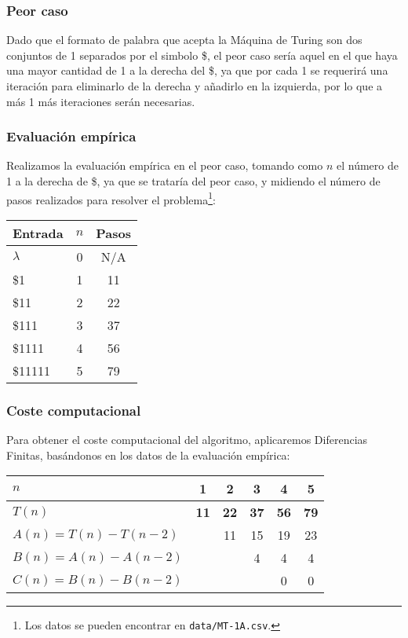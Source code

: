 \subsubsection*{Peor caso}
Dado que el formato de palabra que acepta la Máquina de Turing son dos conjuntos de 1 separados por el simbolo \$, el peor caso sería aquel en el que haya una mayor cantidad de 1 a la derecha del \$, ya que por cada 1 se requerirá una iteración para eliminarlo de la derecha y añadirlo en la izquierda, por lo que a más 1 más iteraciones serán necesarias.

\subsubsection*{Evaluación empírica}
Realizamos la evaluación empírica en el peor caso, tomando como $n$ el número de 1 a la derecha de \$, ya que se trataría del peor caso, y midiendo el número de pasos realizados para resolver el problema\footnote{Los datos se pueden encontrar en \texttt{data/MT-1A.csv}.}:

\begin{table}[h]
    \centering
    \begin{tabular}{lcc}
        Entrada                & $n$ & Pasos \\
        \hline
        $\lambda$               & 0  & N/A \\
        \$1                     & 1  & 11  \\
        \$11                    & 2  & 22  \\
        \$111                   & 3  & 37  \\
        \$1111                  & 4  & 56  \\
        \$11111                 & 5  & 79  \\
    \end{tabular}
\end{table}


\subsubsection*{Coste computacional}
Para obtener el coste computacional del algoritmo, aplicaremos Diferencias Finitas, basándonos en los datos de la evaluación empírica:

\begin{table}[h]
    \centering
    \begin{tabular}{|l|c|c|c|c|c|}
        \hline
        $n$ & \textbf{1} & \textbf{2} & \textbf{3} & \textbf{4} & \textbf{5}\\ \hline
        $T(n)$ & \textbf{11} & \textbf{22} & \textbf{37} & \textbf{56} & \textbf{79}      \\ \hline
        \hline
        $A(n) = T(n) - T(n-2)$ &    & 11 & 15 & 19 & 23\\ \hline
        $B(n) = A(n) - A(n-2)$ &    &    &  4 &  4 &  4\\ \hline
        $C(n) = B(n) - B(n-2)$ &    &    &    &  0 &  0 \\ \hline
    \end{tabular}
\end{table}

